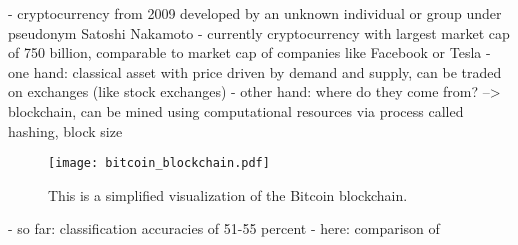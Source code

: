 - cryptocurrency from 2009 developed by an unknown individual or group under pseudonym Satoshi Nakamoto \cite{Bitcoin2009}
- currently cryptocurrency with largest market cap of 750 billion, comparable to market cap of companies like Facebook or Tesla \cite{MarketCapCompany2021} \cite{MarketCapBitcoin2021}
- one hand: classical asset with price driven by demand and supply, can be traded on exchanges (like stock exchanges)
- other hand: where do they come from? --> blockchain, can be mined using computational resources via process called hashing, block size

\begin{figure}
  \centering
  \texttt{[image: bitcoin\_blockchain.pdf]}
  \caption{This is a simplified visualization of the Bitcoin blockchain.}
\end{figure}

- so far: classification accuracies of 51-55 percent
- here: comparison of 